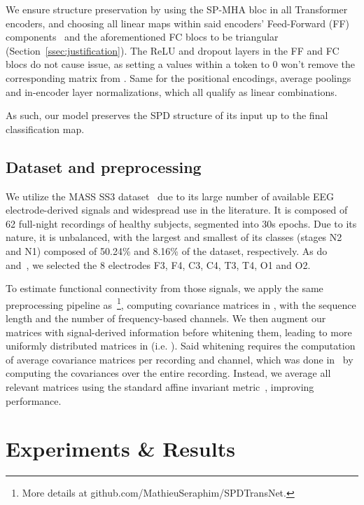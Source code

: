 \documentclass{article}
\makeatletter
\newcommand\footnoteref[1]{\protected@xdef\@thefnmark{\ref{#1}}\@footnotemark}
\makeatother
\begin{document}
We ensure structure preservation by using the SP-MHA bloc in all Transformer encoders, and choosing all linear maps within said encoders' Feed-Forward (FF) components~\cite{transformers} and the aforementioned FC blocs to be triangular (Section~\ref{ssec:justification}).
The ReLU and dropout layers in the FF and FC blocs do not cause issue, as setting a values within a token to 0 won't remove the corresponding matrix from .
Same for the positional encodings, average poolings and in-encoder layer normalizations, which all qualify as linear combinations.

As such, our model preserves the SPD structure of its input up to the final classification map.

\subsection{Dataset and preprocessing}
\label{ssec:dataset}

We utilize the MASS SS3 dataset~\cite{o2014montreal} due to its large number of available EEG electrode-derived signals and widespread use in the literature. It is composed of 62 full-night recordings of healthy subjects, segmented into 30s epochs. Due to its nature, it is unbalanced, with the largest and smallest of its  classes (stages N2 and N1) composed of 50.24\% and 8.16\% of the dataset, respectively.
As do~\cite{paul} and~\cite{CAIP_article}, we selected the 8 electrodes F3, F4, C3, C4, T3, T4, O1 and O2.

To estimate functional connectivity from those signals, we apply the same preprocessing pipeline as~\cite{CAIP_article}\footnote{\label{fn:Git}More details at github.com/MathieuSeraphim/SPDTransNet.}, computing  covariance matrices in , with  the sequence length and  the number of frequency-based channels. We then augment our matrices with signal-derived information before whitening them\footnoteref{fn:Git}, leading to more uniformly distributed matrices in  (i.e. ).
Said whitening requires the computation of average covariance matrices per recording and channel, which was done in~\cite{CAIP_article} by computing the covariances over the entire recording. Instead, we average all relevant matrices using the standard affine invariant metric~\cite{affine_invariant}, improving performance.

\section{Experiments \& Results}
\label{sec:experiments}
\end{document}
